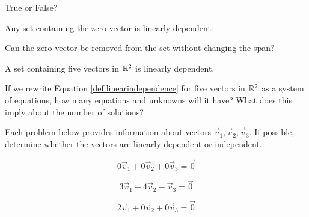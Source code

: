 \documentclass{ximera}
\begin{document}
\begin{problem} True or False?
\begin{problem}\label{prob:TFlinind1}
Any set containing the zero vector is linearly dependent.
\begin{multipleChoice}
 \end{multipleChoice}
  \begin{hint}
 Can the zero vector be removed from the set without changing the span?
 \end{hint}
 \end{problem}
\begin{problem}\label{prob:TFlinind2}
A set containing five vectors in $\mathbb{R}^2$ is linearly dependent.
\begin{multipleChoice}
 \end{multipleChoice}
  \begin{hint}
 If we rewrite Equation \ref{def:linearindependence} for five vectors in $\mathbb{R}^2$ as a system of equations, how many equations and unknowns will it have?  What does this imply about the number of solutions?
 \end{hint}
\end{problem}

\end{problem}

\begin{problem}
Each problem below provides information about vectors $\vec{v}_1, \vec{v}_2, \vec{v}_3$.  If possible, determine whether the vectors are linearly dependent or independent.

\begin{problem}\label{prob:linindmultchoice5}
$$0\vec{v}_1+ 0\vec{v}_2+ 0\vec{v}_3=\vec{0}$$
\begin{multipleChoice}
 \end{multipleChoice}
\end{problem}

\begin{problem}\label{prob:linindmultchoice6}
$$3\vec{v}_1+ 4\vec{v}_2- \vec{v}_3=\vec{0}$$
\begin{multipleChoice}
 \end{multipleChoice}
\end{problem}

\begin{problem}\label{prob:linindmultchoice7}
$$2\vec{v}_1+ 0\vec{v}_2+ 0\vec{v}_3=\vec{0}$$
\begin{multipleChoice}
 \end{multipleChoice}
\end{problem}

\end{problem}
\end{document}
